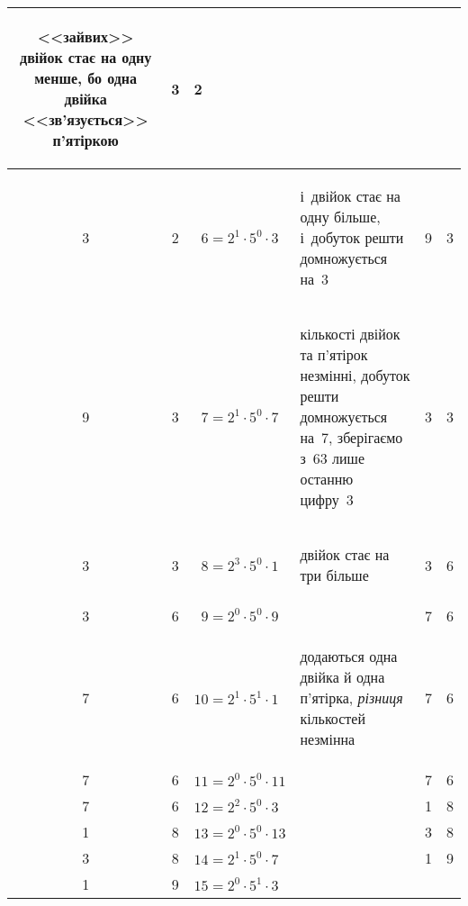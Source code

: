 {\begin{longtable}{@{}c|c|l|p{\widestColumn}|c|c@{}}
\begin{minipage}{\widestColumn}
\begin{small}
<<зайвих>> двійок стає на одну менше, бо одна двійка <<зв'язується>> п'ятіркою
\par\end{small}\end{minipage}
&
3 & 2 \\\hline
3 & 2 &
~$6=2^1\cdot5^0\cdot3$
&
\begin{minipage}{\widestColumn}\begin{small}\setstretch{0.75}
і~двійок стає на одну більше, і~добуток решти домножується на~3
\par\end{small}\end{minipage}
&
9 & 3 \\\hline
9 & 3 &
~$7=2^1\cdot5^0\cdot7$
&
\begin{minipage}{\widestColumn}\begin{small}\setstretch{0.75}
кількості двійок та п'ятірок незмінні, добуток решти домножується на~7, зберігаємо з~63 лише останню цифру~3
\par\end{small}\end{minipage}
&
3 & 3 \\\hline
3 & 3 &
~$8=2^3\cdot5^0\cdot1$
&
\begin{minipage}{\widestColumn}\begin{small}\setstretch{0.75}
двійок стає на три більше
\par\end{small}\end{minipage}
&
3 & 6 \\\hline
3 & 6 &
~$9=2^0\cdot5^0\cdot9$
& &
7 & 6 \\\hline
7 & 6 &
$10=2^1\cdot5^1\cdot1$
&
\begin{minipage}{\widestColumn}\begin{small}\setstretch{0.75}
додаються одна двійка й одна п'ятірка, \emph{різниця} кількостей незмінна
\par\end{small}\end{minipage}
&
7 & 6 \\\hline
7 & 6 &
$11=2^0\cdot5^0\cdot11$
& &
7 & 6 \\\hline
7 & 6 &
$12=2^2\cdot5^0\cdot3$
& &
1 & 8 \\\hline
1 & 8 &
$13=2^0\cdot5^0\cdot13$
& &
3 & 8 \\\hline
3 & 8 &
$14=2^1\cdot5^0\cdot7$
& &
1 & 9 \\\hline
1 & 9 &
$15=2^0\cdot5^1\cdot3$
&
\begin{minipage}{\widestColumn}\begin{small}\setstretch{0.75}

\end{small}
\end{minipage}
\end{longtable}}

